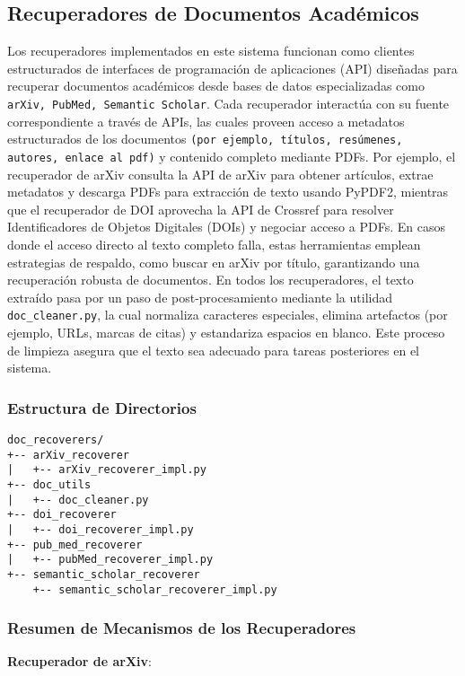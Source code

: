 \documentclass[12pt]{article}
\begin{document}
\subsection{Recuperadores de Documentos Académicos}
Los recuperadores implementados en este sistema funcionan como clientes estructurados de interfaces de programación de aplicaciones (API) diseñadas para recuperar documentos académicos desde bases de datos especializadas como \texttt{arXiv, PubMed, Semantic Scholar}. Cada recuperador interactúa con su fuente correspondiente a través de APIs, las cuales proveen acceso a metadatos estructurados de los documentos \texttt{(por ejemplo, títulos, resúmenes, autores, enlace al pdf)} y contenido completo mediante PDFs. Por ejemplo, el recuperador de arXiv consulta la API de arXiv para obtener artículos, extrae metadatos y descarga PDFs para extracción de texto usando PyPDF2, mientras que el recuperador de DOI aprovecha la API de Crossref para resolver Identificadores de Objetos Digitales (DOIs) y negociar acceso a PDFs. En casos donde el acceso directo al texto completo falla, estas herramientas emplean estrategias de respaldo, como buscar en arXiv por título, garantizando una recuperación robusta de documentos. En todos los recuperadores, el texto extraído pasa por un paso de post-procesamiento mediante la utilidad \texttt{doc\_cleaner.py}, la cual normaliza caracteres especiales, elimina artefactos (por ejemplo, URLs, marcas de citas) y estandariza espacios en blanco. Este proceso de limpieza asegura que el texto sea adecuado para tareas posteriores en el sistema.

\subsubsection{Estructura de Directorios}
\begin{verbatim}
doc_recoverers/
+-- arXiv_recoverer
|   +-- arXiv_recoverer_impl.py
+-- doc_utils
|   +-- doc_cleaner.py
+-- doi_recoverer
|   +-- doi_recoverer_impl.py
+-- pub_med_recoverer
|   +-- pubMed_recoverer_impl.py
+-- semantic_scholar_recoverer
    +-- semantic_scholar_recoverer_impl.py
\end{verbatim}

\subsubsection{Resumen de Mecanismos de los Recuperadores}
    
\textbf{Recuperador de arXiv}:
\end{document}
